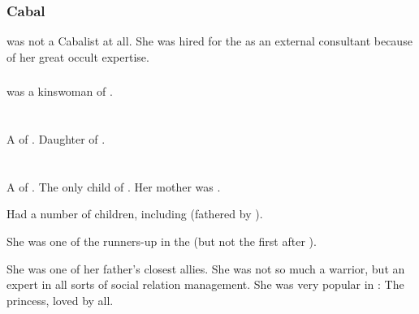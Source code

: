 \subsubsection{Cabal}
\Urizeth was not a Cabalist at all. 
She was hired for the  as an external consultant because of her great occult expertise. 





\subsubsection{\Ganethed}
\Urizeth was a kinswoman of .















\section{\Vesrai}
\index{\Vesrai}
A \ketheran{} \resvil{} of \CiriathSepher. 
Daughter of . 















\section{\Zereth}
\index{\Zereth}
A \ketheran{} \resvil{} of \CiriathSepher. 
The only child of .
Her mother was . 

Had a number of children, including  (fathered by ). 

She was one of the runners-up in the  (but not the first after \Azraid). 

She was one of her father's closest allies. 
She was not so much a warrior, but an expert in all sorts of social relation management. 
She was very popular in \CiriathSepher{}: 
The princess, loved by all. 























